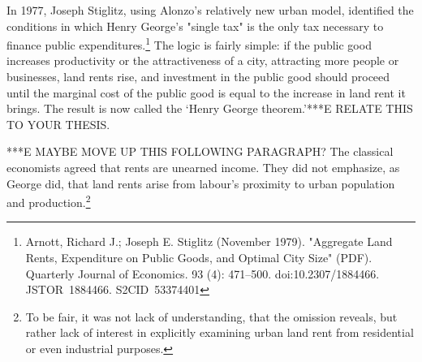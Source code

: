    
  In 1977, Joseph Stiglitz, using Alonzo's relatively new urban model, identified the conditions in which Henry George's "single tax" is  the only tax necessary to finance public expenditures.\footnote{Arnott, Richard J.; Joseph E. Stiglitz (November 1979). "Aggregate Land Rents, Expenditure on Public Goods, and Optimal City Size" (PDF). Quarterly Journal of Economics. 93 (4): 471–500. doi:10.2307/1884466. JSTOR 1884466. S2CID 53374401 }   The logic is fairly simple: if the public good increases productivity or the attractiveness of a city, attracting more people or businesses, land rents rise, and investment in the public good should proceed until the marginal cost of the public good is equal to the increase in land rent it brings. The result is now called the `Henry George theorem.'***E RELATE THIS TO YOUR THESIS. %
  
  ***E MAYBE MOVE UP THIS FOLLOWING PARAGRAPH? %
The classical economists agreed that rents are unearned income. They did not emphasize, as George did, that land rents arise from labour's proximity to urban population and production.\footnote{To be fair, it was not lack of understanding, that the omission reveals, but rather lack of interest in explicitly examining urban land rent from residential or even industrial purposes.}%






